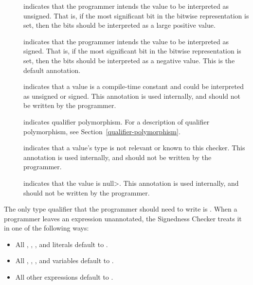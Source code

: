\begin{description}

\item[]
    indicates that the programmer intends the value to be
    interpreted as unsigned.
    That is, if the most significant bit in the bitwise representation is
    set, then the bits should be interpreted as a large positive value.

\item[]
    indicates that the programmer intends the value to be
    interpreted as signed.
    That is, if the most significant bit in the bitwise representation is
    set, then the bits should be interpreted as a negative value.
    This is the default annotation.

\item[]
    indicates that a value is a compile-time constant and could be
    interpreted as unsigned or signed.
    This annotation is used internally, and should not
    be written by the programmer.

 \item[]
   indicates qualifier polymorphism.
   For a description of qualifier polymorphism, see
   Section~\ref{qualifier-polymorphism}.

\item[]
    indicates that a value's type is not relevant or known to this checker.
    This annotation is used internally, and should not be
    written by the programmer.

\item[]
  indicates that the value is \<null>.
    This annotation is used internally, and should not
    be written by the programmer.

\end{description}



The only type qualifier that the programmer should need to write is
.
When a programmer leaves an expression unannotated, the
Signedness Checker treats it in one of the following ways:

\begin{itemize}

    \item
    All , , , and  literals default
    to .
    \item
    All , , , and  variables default
    to .
    \item
    All other expressions default to .

\end{itemize}


